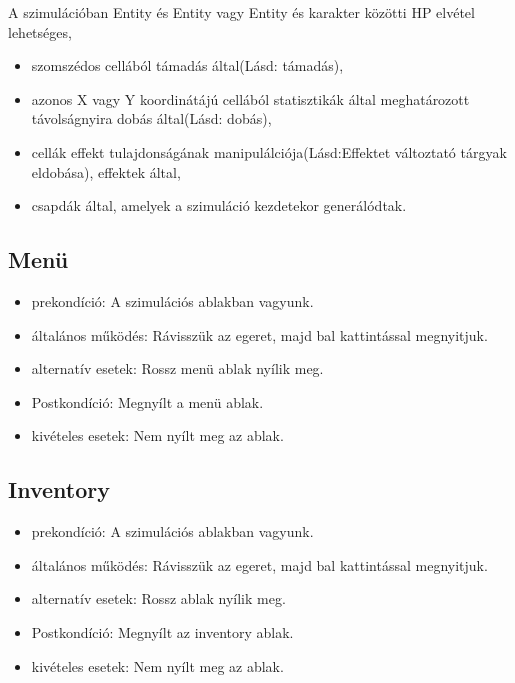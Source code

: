 
A szimulációban Entity és Entity vagy Entity és karakter közötti HP elvétel lehetséges,
\begin{itemize}
    \item szomszédos cellából támadás által(Lásd: támadás),
    \item azonos X vagy Y koordinátájú cellából statisztikák által meghatározott távolságnyira dobás által(Lásd: dobás),
    \item cellák effekt tulajdonságának manipulálciója(Lásd:Effektet változtató tárgyak eldobása), effektek által,
    \item csapdák által, amelyek a szimuláció kezdetekor generálódtak.
\end{itemize}


\subsection{Menü}

\begin{itemize}
    \item prekondíció: A szimulációs ablakban vagyunk.
    \item általános működés: Rávisszük az egeret, majd bal kattintással megnyitjuk.
    \item alternatív esetek: Rossz menü ablak nyílik meg.
    \item Postkondíció: Megnyílt a menü ablak.
    \item kivételes esetek: Nem nyílt meg az ablak.
\end{itemize}

\subsection{Inventory}

\begin{itemize}
    \item prekondíció: A szimulációs ablakban vagyunk.
    \item általános működés: Rávisszük az egeret, majd bal kattintással megnyitjuk.
    \item alternatív esetek: Rossz ablak nyílik meg.
    \item Postkondíció: Megnyílt az inventory ablak.
    \item kivételes esetek: Nem nyílt meg az ablak.
\end{itemize}

